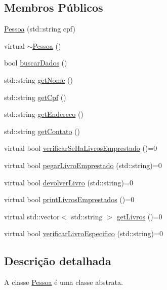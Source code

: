\subsection*{Membros Públicos}
\begin{DoxyCompactItemize}
\item 
\mbox{\hyperlink{class_pessoa_a53285703ed58f6b634eb75da443cd1d6}{Pessoa}} (std\+::string cpf)
\item 
virtual \mbox{\hyperlink{class_pessoa_a1501b01d184497075fe5ce042da3ae44}{$\sim$\+Pessoa}} ()
\item 
bool \mbox{\hyperlink{class_pessoa_ac04dffcb5114b117daf83061f8349f5d}{buscar\+Dados}} ()
\item 
std\+::string \mbox{\hyperlink{class_pessoa_a5f4f2063d62eaea38673da5fd5283465}{get\+Nome}} ()
\item 
std\+::string \mbox{\hyperlink{class_pessoa_aac57d87193996bbe7420804f9ac298fb}{get\+Cpf}} ()
\item 
std\+::string \mbox{\hyperlink{class_pessoa_a2194fadbbd94e5220e29b4a12531f26c}{get\+Endereco}} ()
\item 
std\+::string \mbox{\hyperlink{class_pessoa_a909e765b8fa0cfa405211a9ac9a985c1}{get\+Contato}} ()
\item 
virtual bool \mbox{\hyperlink{class_pessoa_a547989725eea2157a721541846091929}{verificar\+Se\+Ha\+Livros\+Emprestado}} ()=0
\item 
virtual bool \mbox{\hyperlink{class_pessoa_aca2ded64e7520692148ee84d923c5c28}{pegar\+Livro\+Emprestado}} (std\+::string)=0
\item 
virtual bool \mbox{\hyperlink{class_pessoa_a92f80c6215d5c79ce1e2915df3a34a5b}{devolver\+Livro}} (std\+::string)=0
\item 
virtual bool \mbox{\hyperlink{class_pessoa_acf173c004fed24a7ab087951b3e35814}{print\+Livros\+Emprestados}} ()=0
\item 
virtual std\+::vector$<$ std\+::string $>$ \mbox{\hyperlink{class_pessoa_a9f6907ce8a5ef6fc942f0fa0d1f27854}{get\+Livros}} ()=0
\item 
virtual bool \mbox{\hyperlink{class_pessoa_ad405167e003a8b8960176b45ae70803c}{verificar\+Livro\+Especifico}} (std\+::string)=0
\end{DoxyCompactItemize}


\subsection{Descrição detalhada}
A classe \mbox{\hyperlink{class_pessoa}{Pessoa}} é uma classe abstrata. 

